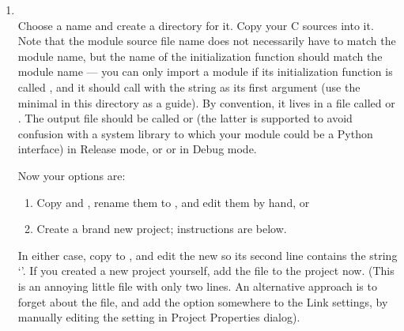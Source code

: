 \begin{enumerate}
\begin{verbatim}
C>..\..\PCbuild\python_d
Adding parser accelerators ...
Done.
Python 2.2 (#28, Dec 19 2001, 23:26:37) [MSC 32 bit (Intel)] on win32
Type "copyright", "credits" or "license" for more information.
>>> import example
[4897 refs]
>>> example.foo()
Hello, world
[4903 refs]
>>>
\end{verbatim}

    Congratulations!  You've successfully built your first Python
    extension module.

  \item
  \\
    Choose a name and create a directory for it.  Copy your C sources
    into it.  Note that the module source file name does not
    necessarily have to match the module name, but the name of the
    initialization function should match the module name --- you can
    only import a module  if its initialization function
    is called , and it should call
     with the string  as its
    first argument (use the minimal  in this directory
    as a guide).  By convention, it lives in a file called
     or .  The output file should be
    called  or  (the latter is supported
    to avoid confusion with a system library  to which
    your module could be a Python interface) in Release mode, or
     or  in Debug mode.

    Now your options are:

    \begin{enumerate}
      \item  Copy  and , rename
             them to , and edit them by hand, or
      \item  Create a brand new project; instructions are below.
    \end{enumerate}

    In either case, copy 
    to , and edit the new
     so its second line contains the string
    `'.  If you created a new project yourself, add the
    file  to the project now.  (This is an annoying
    little file with only two lines.  An alternative approach is to
    forget about the  file, and add the option
     somewhere to the Link settings, by
    manually editing the setting in Project Properties dialog).


\end{enumerate}
